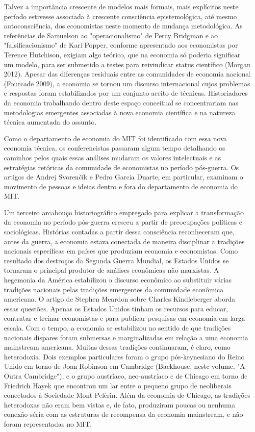 \documentclass[12pt]{article}
\begin{document}
Talvez a importância crescente de modelos mais formais, mais explícitos neste período estivesse associada à crescente consciência epistemológica, até mesmo autoconsciência, dos economistas neste momento de mudança metodológica. As referências de Samuelson ao "operacionalismo" de Percy Bridgman e ao "falsificacionismo" de Karl Popper, conforme apresentado aos economistas por Terence Hutchison, exigiam algo teórico, que na economia só poderia significar um modelo, para ser submetido a testes para reivindicar status científico (Morgan 2012). Apesar das diferenças residuais entre as comunidades de economia nacional (Fourcade 2009), a economia se tornou um discurso internacional cujos problemas e respostas foram estabilizados por um conjunto aceito de técnicas. Historiadores da economia trabalhando dentro deste espaço conceitual se concentrariam nas metodologias emergentes associadas à nova economia científica e na natureza técnica aumentada do assunto.

Como o departamento de economia do MIT foi identificado com essa nova economia técnica, os conferencistas passaram algum tempo detalhando os caminhos pelos quais essas análises mudaram os valores intelectuais e as estratégias retóricas da comunidade de economistas no período pós-guerra. Os artigos de Andrej Svorenčík e Pedro Garcia Duarte, em particular, examinam o movimento de pessoas e ideias dentro e fora do departamento de economia do MIT.

Um terceiro arcabouço historiográfico empregado para explicar a transformação da economia no período pós-guerra cresceu a partir de preocupações políticas e sociológicas. Histórias contadas a partir dessa consciência reconheceram que, antes da guerra, a economia estava conectada de maneira disciplinar a tradições nacionais específicas em países que produziam economia e economistas. Como resultado dos destroços da Segunda Guerra Mundial, os Estados Unidos se tornaram o principal produtor de análises econômicas não marxistas. A hegemonia da América estabilizou o discurso econômico ao substituir várias tradições nacionais pelas tradições emergentes da comunidade econômica americana. O artigo de Stephen Meardon sobre Charles Kindleberger aborda essas questões. Apenas os Estados Unidos tinham os recursos para educar, contratar e treinar economistas e para publicar pesquisas em economia em larga escala. Com o tempo, a economia se estabilizou no sentido de que tradições nacionais díspares foram submersas e marginalizadas em relação a uma economia mainstream americana. Muitas dessas tradições continuaram, é claro, como heterodoxia. Dois exemplos particulares foram o grupo pós-keynesiano do Reino Unido em torno de Joan Robinson em Cambridge (Backhouse, neste volume, "A Outra Cambridge"), e o grupo austríaco, neo-austríaco e de Chicago em torno de Friedrich Hayek que encontrou um lar entre o pequeno grupo de neoliberais conectados à Sociedade Mont Pelèrin. Além da economia de Chicago, as tradições heterodoxas não eram bem vistas e, de fato, produziram poucas ou nenhuma conexão séria com as estruturas de recompensa da economia mainstream, e não foram representadas no MIT.
\end{document}
